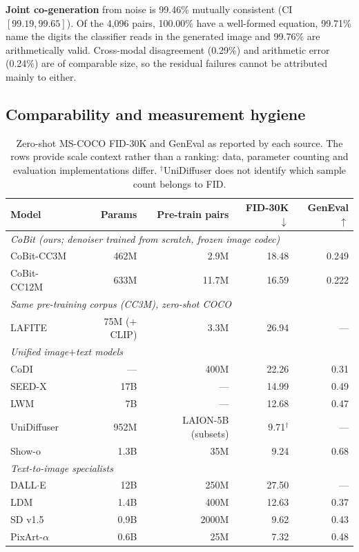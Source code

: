 \textbf{Joint co-generation} from noise is 99.46\% mutually consistent (CI $[99.19, 99.65]$). Of
the 4,096 pairs, 100.00\% have a well-formed equation, 99.71\% name the digits the classifier reads
in the generated image and 99.76\% are arithmetically valid. Cross-modal disagreement (0.29\%) and
arithmetic error (0.24\%) are of comparable size, so the residual failures cannot be attributed
mainly to either.

\subsection{Comparability and measurement hygiene}
\label{app:image:repro}

\begin{table}[t]
\centering
\small
\setlength{\tabcolsep}{4pt}
\begin{tabular}{lrrrr}
\toprule
\textbf{Model} & \textbf{Params} & \textbf{Pre-train pairs} & \textbf{FID-30K}$\downarrow$ & \textbf{GenEval}$\uparrow$ \\
\midrule
\multicolumn{5}{l}{\emph{CoBit (ours; denoiser trained from scratch, frozen image codec)}}\\
CoBit-CC3M & 462M & 2.9M & 18.48 & 0.249 \\
CoBit-CC12M & 633M & 11.7M & 16.59 & 0.222 \\
\midrule
\multicolumn{5}{l}{\emph{Same pre-training corpus (CC3M), zero-shot COCO}}\\
LAFITE \citep{image:lafite} & 75M ($+$CLIP) & 3.3M & 26.94 & --- \\
\midrule
\multicolumn{5}{l}{\emph{Unified image$+$text models}}\\
CoDI \citep{image:codi} & --- & 400M & 22.26 & 0.31 \\
SEED-X \citep{image:seedx} & 17B & --- & 14.99 & 0.49 \\
LWM \citep{image:lwm} & 7B & --- & 12.68 & 0.47 \\
UniDiffuser \citep{image:unidiffuser} & 952M & LAION-5B (subsets) & 9.71$^{\dagger}$ & --- \\
Show-o \citep{image:showo} & 1.3B & 35M & 9.24 & 0.68 \\
\midrule
\multicolumn{5}{l}{\emph{Text-to-image specialists}}\\
DALL$\cdot$E \citep{image:dalle} & 12B & 250M & 27.50 & --- \\
LDM \citep{image:ldm} & 1.4B & 400M & 12.63 & 0.37 \\
SD v1.5 \citep{image:ldm} & 0.9B & 2000M & 9.62 & 0.43 \\
PixArt-$\alpha$ \citep{image:pixart} & 0.6B & 25M & 7.32 & 0.48 \\
\bottomrule
\end{tabular}
\caption{Zero-shot MS-COCO FID-30K and GenEval as reported by each source. The rows provide scale
context rather than a ranking: data, parameter counting and evaluation implementations differ.
$^{\dagger}$UniDiffuser does not identify which sample count belongs to FID.}
\label{tab:image:litcomparison}
\end{table}

